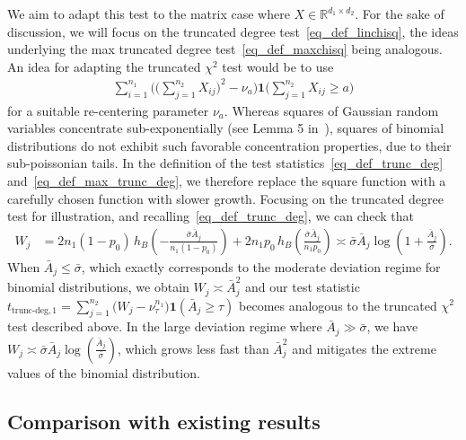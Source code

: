 \documentclass{article}
\newcommand{\R}{\mathbb{R}}
\newcommand{\one}{\mathbf{1}}
\newcommand{\chisqlin}{\text{trunc-deg}}
\begin{document}
We aim to adapt this test to the matrix case where $X \in \R^{d_1 \times d_2}$. 
For the sake of discussion, we will focus on the truncated degree test~\eqref{eq_def_linchisq}, the ideas underlying the max truncated degree test~\eqref{eq_def_maxchisq} being analogous.
An idea for adapting the truncated $\chi^2$ test would be to use 
\begin{align*}
    \sum_{i=1}^{n_1} \Big(\Big(\sum_{j=1}^{n_2} X_{ij}\Big)^2 - \nu_a\Big)\one{\big(\sum_{j=1}^{n_2} X_{ij} \geq a\big)}
\end{align*}
for a suitable re-centering parameter $\nu_a$.
Whereas squares of Gaussian random variables concentrate sub-exponentially (see Lemma 5 in~\cite{liu2021minimax}), squares of binomial distributions do not exhibit such favorable concentration properties, due to their sub-poissonian tails. 
In the definition of the test statistics~\eqref{eq_def_trunc_deg} and~\eqref{eq_def_max_trunc_deg}, we therefore replace the square function with a carefully chosen function with slower growth. 
Focusing on the truncated degree test for illustration, and recalling~\eqref{eq_def_trunc_deg}, we can check that
\begin{align*}
    W_j &= 2n_1(1-p_0) \,h_B\!\left(-\frac{\bar \sigma \bar A_j}{n_1(1-p_0)}\right) + 2n_1 p_0 \,h_B\!\left(\frac{\bar \sigma \bar A_j}{n_1p_0}\right) \asymp 
        \bar \sigma \bar A_j \log(1+\frac{\bar A_j}{\bar \sigma}).
\end{align*}
When $\bar A_j \leq \bar \sigma$, which exactly corresponds to the moderate deviation regime for binomial distributions, we obtain $W_j \asymp \bar A_j^2$ and our test statistic $t_{\chisqlin, 1} = \sum_{j = 1}^{n_2}\big(W_j - \nu_\tau^{n_1}\big)\one(\bar{A}_j \geq \tau)$ becomes analogous to the truncated $\chi^2$ test described above. 
In the large deviation regime where $\bar A_j \gg \bar \sigma$, we have $W_j \asymp \bar \sigma \bar A_j \log(\frac{\bar A_j}{\bar \sigma})$, which grows less fast than $\bar A_j^2$ and mitigates the extreme values of the binomial distribution. 

\subsection{Comparison with existing results}
\end{document}
